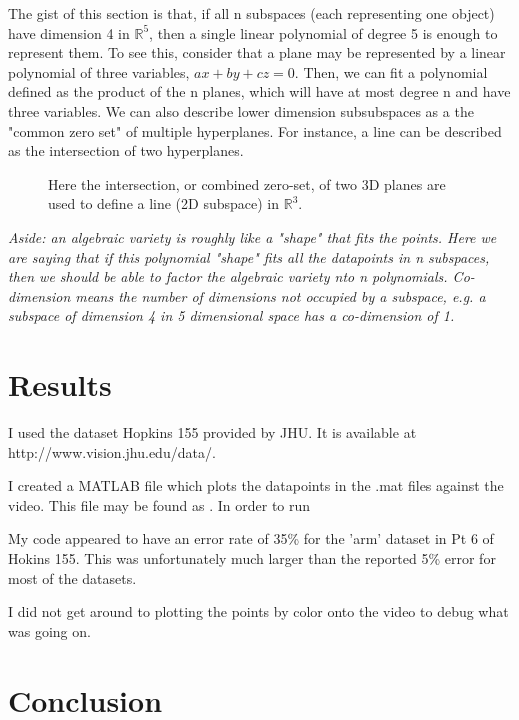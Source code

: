 \documentclass[a4paper]{article}
\begin{document}
 The gist of this section is that, if all n subspaces (each representing one
 object) have dimension 4 in $\mathbb{R}^5$, then a single linear polynomial of
 degree 5 is enough to represent them. To see this, consider that a plane may be
 represented by a linear polynomial of three variables, $ax+by+cz = 0$. Then, we
 can fit a polynomial defined as the product of the n planes, which will have at
 most degree n and have three variables. We can also describe lower dimension
 subsubspaces as a the "common zero set" of multiple hyperplanes. For instance,
 a line can be described as the intersection of two hyperplanes. 


 \begin{figure}
     \centering
     \caption{Here the intersection, or combined zero-set, of two 3D planes are
     used to define a line (2D subspace) in $\mathbb{R}^3$.}
 \end{figure}

 \textit{Aside: an algebraic variety is roughly like a "shape" that fits the
 points. Here we are saying that if this polynomial "shape" fits all the
 datapoints in n subspaces,
 then we should be able to factor the algebraic variety nto n polynomials.  Co-dimension means the number of dimensions not occupied by a subspace, e.g. a subspace of dimension 4 in 5 dimensional space has a co-dimension of 1. }
\section{Results}

I used the dataset Hopkins 155 provided by JHU. It is available at http://www.vision.jhu.edu/data/.

I created a MATLAB file which plots the datapoints in the .mat files against the
video. This file may be found as . In order to run

My code appeared to have an error rate of 35\% for the 'arm' dataset in Pt 6 of
Hokins 155. This was unfortunately much larger than the reported 5\% error for
most of the datasets.

I did not get around to plotting the points by color onto the video to debug
what was going on.


\section{Conclusion}
\end{document}
